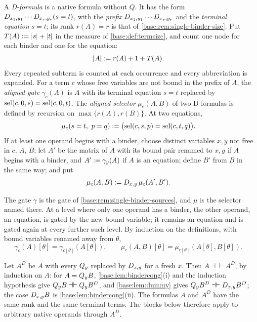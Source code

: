 \begin{definition}
\label{base:def:agate}
A \emph{D-formula} is a native formula without $Q$.  It has the form
$D_{x_1,y_1}\cdots D_{x_r,y_r}(s=t)$, with the \emph{prefix}
$D_{x_1,y_1}\cdots D_{x_r,y_r}$ and the \emph{terminal equation} $s=t$; its
rank $r(A)=r$ is that of \cref{base:rem:single-binder-size}.  Put
$T(A)\mathrel{:=}|s|+|t|$ in the measure of \cref{base:def:termsize}, and count one
node for each binder and one for the equation:
\[
 |A|\mathrel{:=} r(A)+1+T(A).
\]
Every repeated subterm is counted at each occurrence and every abbreviation
is expanded.  For a term $c$ whose free variables are not bound in the
prefix of $A$, the \emph{aligned gate} $\gamma_c(A)$ is $A$ with its
terminal equation $s=t$ replaced by $\operatorname{sel}(c,0,s)=\operatorname{sel}(c,0,t)$.  The
\emph{aligned selector} $\mu_c(A,B)$ of two D-formulas is defined by
recursion on $\max\{r(A),r(B)\}$.  At two equations,
\[
 \mu_c(s=t,\ p=q)\defeq\bigl(\sel(c,s,p)=\sel(c,t,q)\bigr).
\]
If at least one operand begins with a binder, choose distinct variables
$x,y$ not free in $c$, $A$, $B$; let $A'$ be the matrix of $A$ with its bound
pair renamed to $x,y$ if $A$ begins with a binder, and $A'\mathrel{:=}\gamma_y(A)$
if $A$ is an equation; define $B'$ from $B$ in the same way; and put
\[
 \mu_c(A,B)\mathrel{:=}D_{x,y}\,\mu_c(A',B').
\]
\end{definition}

The gate $\gamma$ is the gate of \cref{base:rem:single-binder-sources}, and
$\mu$ is the selector named there.  At a level where only one operand has a
binder, the other operand, an equation, is gated by the new bound variable;
it remains an equation and is gated again at every further such level.  By
induction on the definitions, with bound variables renamed away from
$\theta$,
\[
 \gamma_c(A)[\theta]=\gamma_{c[\theta]}(A[\theta]),\qquad
 \mu_c(A,B)[\theta]=\mu_{c[\theta]}(A[\theta],B[\theta]).
\]

\begin{remark}
\label{base:rem:dformula}
Let $A^{D}$ be $A$ with every $Q_{y}$ replaced by $D_{x,y}$ for a fresh
$x$.  Then $A\dashv\vdash A^{D}$, by induction on $A$: for $A=Q_{y}B$,
\cref{base:lem:bindercong}(i) and the induction hypothesis give
$Q_{y}B\dashv\vdash Q_{y}B^{D}$, and \cref{base:lem:dummy} gives
$Q_{y}B^{D}\dashv\vdash D_{x,y}B^{D}$; the case $D_{x,y}B$ is
\cref{base:lem:bindercong}(ii).  The formulas $A$ and $A^{D}$ have the same
rank and the same terminal terms.  The blocks below therefore apply to
arbitrary native operands through $A^{D}$.
\end{remark}


